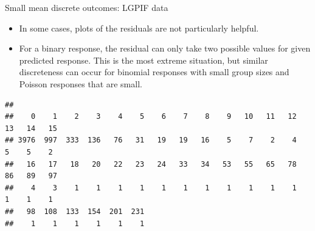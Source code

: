 \documentclass[
  ignorenonframetext,
]{beamer}
\newenvironment{Shaded}{\begin{snugshade}}{\end{snugshade}}
\newcommand{\FunctionTok}[1]{\textcolor[rgb]{0.00,0.00,0.00}{#1}}
\newcommand{\NormalTok}[1]{#1}
\newcommand{\OtherTok}[1]{\textcolor[rgb]{0.56,0.35,0.01}{#1}}
\newcommand{\SpecialCharTok}[1]{\textcolor[rgb]{0.00,0.00,0.00}{#1}}
\newcommand{\StringTok}[1]{\textcolor[rgb]{0.31,0.60,0.02}{#1}}
\providecommand{\tightlist}{%
  \setlength{\itemsep}{0pt}\setlength{\parskip}{0pt}}
\begin{document}
\begin{frame}[fragile]{Small mean discrete outcomes: LGPIF data}
\protect\hypertarget{small-mean-discrete-outcomes-lgpif-data}{}
\begin{itemize}
\tightlist
\item
  In some cases, plots of the residuals are not particularly helpful.
\item
  For a binary response, the residual can only take two possible values
  for given predicted response. This is the most extreme situation, but
  similar discreteness can occur for binomial responses with small group
  sizes and Poisson responses that are small.
\end{itemize}

\scriptsize

\begin{Shaded}
\end{Shaded}

\begin{verbatim}
## 
##    0    1    2    3    4    5    6    7    8    9   10   11   12   13   14   15 
## 3976  997  333  136   76   31   19   19   16    5    7    2    4    5    5    2 
##   16   17   18   20   22   23   24   33   34   53   55   65   78   86   89   97 
##    4    3    1    1    1    1    1    1    1    1    1    1    1    1    1    1 
##   98  108  133  154  201  231 
##    1    1    1    1    1    1
\end{verbatim}
\end{frame}
\end{document}
